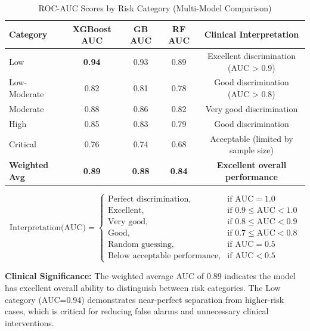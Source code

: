 \documentclass[3p,times,procedia]{elsarticle}
\begin{document}
\FloatBarrier
\vspace{15pt}

\begin{table}[!ht]
\centering
\caption{ROC-AUC Scores by Risk Category (Multi-Model Comparison)}
\small
\begin{tabular}{|l|c|c|c|c|}
\hline
\rowcolor{gray!20}
\textbf{Category} & \textbf{XGBoost AUC} & \textbf{GB AUC} & \textbf{RF AUC} & \textbf{Clinical Interpretation} \\
\hline
Low & \textbf{0.94} & 0.93 & 0.89 & Excellent discrimination (AUC > 0.9) \\
\rowcolor{gray!10}
Low-Moderate & 0.82 & 0.81 & 0.78 & Good discrimination (AUC > 0.8) \\
Moderate & 0.88 & 0.86 & 0.82 & Very good discrimination \\
\rowcolor{gray!10}
High & 0.85 & 0.83 & 0.79 & Good discrimination \\
Critical & 0.76 & 0.74 & 0.68 & Acceptable (limited by sample size) \\
\hline
\rowcolor{gray!20}
\textbf{Weighted Avg} & \textbf{0.89} & \textbf{0.88} & \textbf{0.84} & \textbf{Excellent overall performance} \\
\hline
\end{tabular}
\end{table}

\FloatBarrier
\vspace{10pt}

\[
\text{Interpretation(AUC)} =
\begin{cases}
\text{Perfect discrimination}, & \text{if } \text{AUC} = 1.0 \\
\text{Excellent}, & \text{if } 0.9 \le \text{AUC} < 1.0 \\
\text{Very\ good}, & \text{if } 0.8 \le \text{AUC} < 0.9 \\
\text{Good}, & \text{if } 0.7 \le \text{AUC} < 0.8 \\
\text{Random\ guessing}, & \text{if } \text{AUC} = 0.5 \\
\text{Below\ acceptable\ performance}, & \text{if } \text{AUC} < 0.5
\end{cases}
\]

\vspace{5pt}

\textbf{Clinical Significance:} The weighted average AUC of 0.89 indicates the model has excellent overall ability to distinguish between risk categories. The Low category (AUC=0.94) demonstrates near-perfect separation from higher-risk cases, which is critical for reducing false alarms and unnecessary clinical interventions.
\end{document}
